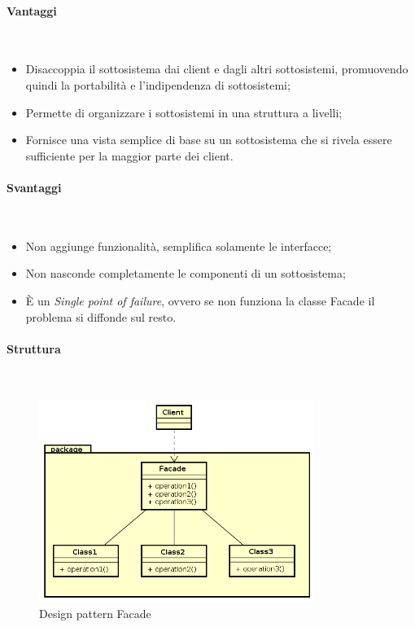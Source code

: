 \paragraph{Vantaggi} \mbox{} \\
\begin{itemize}
\item Disaccoppia il sottosistema dai client e dagli altri sottosistemi, promuovendo quindi la portabilità e l'indipendenza di sottosistemi;
\item Permette di organizzare i sottosistemi in una struttura a livelli;
\item Fornisce una vista semplice di base su un sottosistema che si rivela essere sufficiente per la maggior parte dei client.
\end{itemize}
\paragraph{Svantaggi} \mbox{} \\
\begin{itemize}
\item Non aggiunge funzionalità, semplifica solamente le interfacce;
\item Non nasconde completamente le componenti di un sottosistema;
\item È un \textit{Single point of failure}, ovvero se non funziona la classe Facade il problema si diffonde sul resto.
\end{itemize}
\paragraph{Struttura} \mbox{} \\
\begin{figure}[H]
\centering
\includegraphics[width=0.8\textwidth]{res/sections/backend/facade.png}
\caption{Design pattern Facade}
\end{figure}
